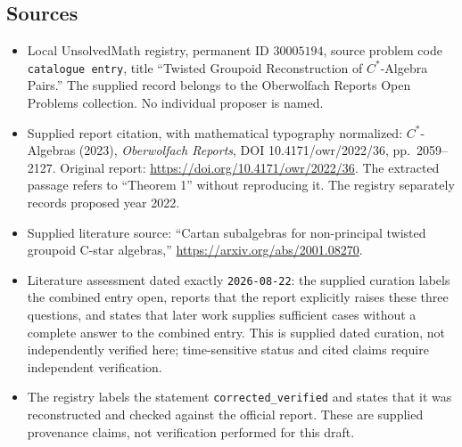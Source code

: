 \documentclass[11pt]{article}
\begin{document}
\subsection{Sources}
\begin{itemize}
\item Local UnsolvedMath registry, permanent ID \(30005194\), source problem code \texttt{catalogue entry}, title ``Twisted Groupoid Reconstruction of \(C^*\)-Algebra Pairs.'' The supplied record belongs to the Oberwolfach Reports Open Problems collection. No individual proposer is named.
\item Supplied report citation, with mathematical typography normalized: \(C^*\)-Algebras (2023), \emph{Oberwolfach Reports}, DOI 10.4171/owr/2022/36, pp.\ 2059--2127. Original report: \url{https://doi.org/10.4171/owr/2022/36}. The extracted passage refers to ``Theorem 1'' without reproducing it. The registry separately records proposed year 2022.
\item Supplied literature source: ``Cartan subalgebras for non-principal twisted groupoid C-star algebras,'' \url{https://arxiv.org/abs/2001.08270}.
\item Literature assessment dated exactly \texttt{2026-08-22}: the supplied curation labels the combined entry open, reports that the report explicitly raises these three questions, and states that later work supplies sufficient cases without a complete answer to the combined entry. This is supplied dated curation, not independently verified here; time-sensitive status and cited claims require independent verification.
\item The registry labels the statement \texttt{corrected\_verified} and states that it was reconstructed and checked against the official report. These are supplied provenance claims, not verification performed for this draft.
\end{itemize}
\end{document}
